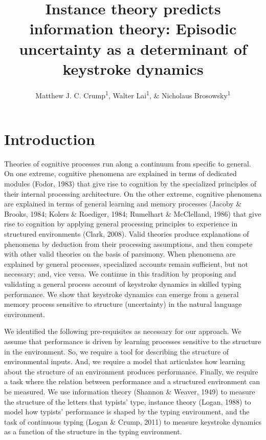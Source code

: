 \documentclass[floatsintext,man]{apa6}
\title{Instance theory predicts information theory: Episodic uncertainty as a
determinant of keystroke dynamics}
\author{Matthew J. C. Crump\textsuperscript{1}, Walter Lai\textsuperscript{1}, \& Nicholaus Brosowsky\textsuperscript{1}}
\affiliation{
    \vspace{0.5cm}
          \textsuperscript{1} Brooklyn College of the City University of New York  }
\theoremstyle{definition}
\theoremstyle{definition}
\theoremstyle{definition}
\theoremstyle{remark}
\begin{document}
\maketitle

\setcounter{secnumdepth}{0}



\section{Introduction}\label{introduction}

Theories of cognitive processes run along a continuum from specific to
general. On one extreme, cognitive phenomena are explained in terms of
dedicated modules (Fodor, 1983) that give rise to cognition by the
specialized principles of their internal processing architecture. On the
other extreme, cognitive phenomena are explained in terms of general
learning and memory processes (Jacoby \& Brooks, 1984; Kolers \&
Roediger, 1984; Rumelhart \& McClelland, 1986) that give rise to
cognition by applying general processing principles to experience in
structured environments (Clark, 2008). Valid theories produce
explanations of phenomena by deduction from their processing
assumptions, and then compete with other valid theories on the basis of
parsimony. When phenomena are explained by general processes,
specialized accounts remain sufficient, but not necessary; and, vice
versa. We continue in this tradition by proposing and validating a
general process account of keystroke dynamics in skilled typing
performance. We show that keystroke dynamics can emerge from a general
memory process sensitive to structure (uncertainty) in the natural
language environment.

We identified the following pre-requisites as necessary for our
approach. We assume that performance is driven by learning processes
sensitive to the structure in the environment. So, we require a tool for
describing the structure of environmental inputs. And, we require a
model that articulates how learning about the structure of an
environment produces performance. Finally, we require a task where the
relation between performance and a structured environment can be
measured. We use information theory (Shannon \& Weaver, 1949) to measure
the structure of the letters that typists' type, instance theory (Logan,
1988) to model how typists' performance is shaped by the typing
environment, and the task of continuous typing (Logan \& Crump, 2011) to
measure keystroke dynamics as a function of the structure in the typing
environment.
\end{document}
